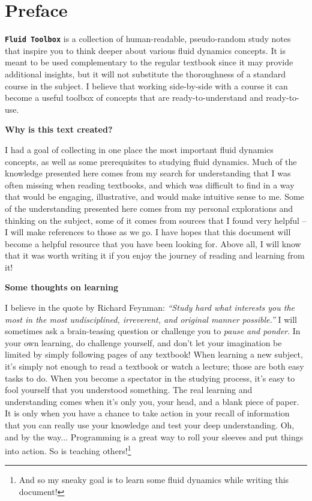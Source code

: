 \documentclass[12pt]{report}
\begin{document}
\setlength{\parskip}{0.6em}
\setlength{\parindent}{0cm}

\chapter*{Preface}
\thispagestyle{empty}



\texttt{\textbf{Fluid Toolbox}} is a collection of human-readable, pseudo-random study notes that inspire you to think deeper about various fluid dynamics concepts. It is meant to be used complementary to the regular textbook since it may provide additional insights, but it will not substitute the thoroughness of a standard course in the subject. I believe that working side-by-side with a course it can become a useful toolbox of concepts that are ready-to-understand and ready-to-use.

\textbf{Why is this text created?}

I had a goal of collecting in one place the most important fluid dynamics concepts, as well as some prerequisites to studying fluid dynamics. Much of the knowledge presented here comes from my search for understanding that I was often missing when reading textbooks, and which was difficult to find in a way that would be engaging, illustrative, and would make intuitive sense to me. Some of the understanding presented here comes from my personal explorations and thinking on the subject, some of it comes from sources that I found very helpful -- I will make references to those as we go. I have hopes that this document will become a helpful resource that you have been looking for. Above all, I will know that it was worth writing it if you enjoy the journey of reading and learning from it!

\textbf{Some thoughts on learning}

I believe in the quote by Richard Feynman: \textit{``Study hard what interests you the most in the most undisciplined, irreverent, and original manner possible.''} I will sometimes ask a brain-teasing question or challenge you to \textit{pause and ponder}. In your own learning, do challenge yourself, and don't let your imagination be limited by simply following pages of any textbook! When learning a new subject, it's simply not enough to read a textbook or watch a lecture; those are both easy tasks to do. When you become a spectator in the studying process, it's easy to fool yourself that you understood something. The real learning and understanding comes when it's only you, your head, and a blank piece of paper. It is only when you have a chance to take action in your recall of information that you can really use your knowledge and test your deep understanding. Oh, and by the way... Programming is a great way to roll your sleeves and put things into action. So is teaching others!\footnote{And so my sneaky goal is to learn some fluid dynamics while writing this document!}
\end{document}
